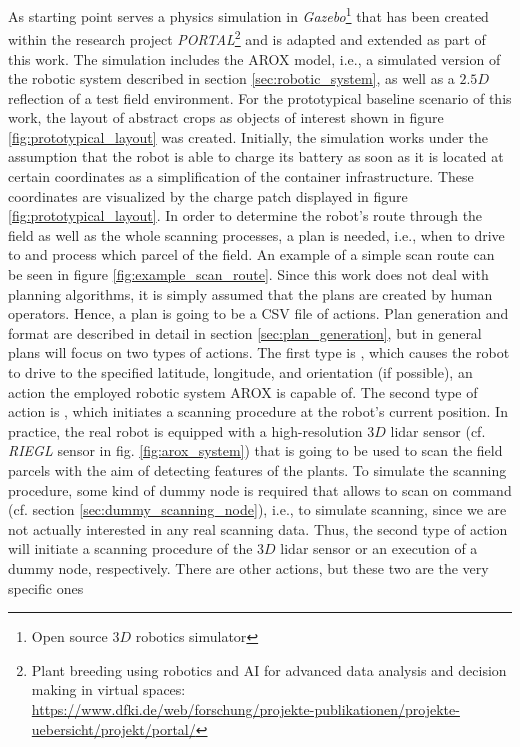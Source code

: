 \documentclass[english, master, utf8]{base/thesis_KBS}
\newcommand{\code}{\collectverb{\codebox}}
\begin{document}
As starting point serves a physics simulation in \textit{Gazebo}\footnote{Open source $3D$ robotics simulator} that has been created within the research project
\textit{PORTAL}\footnote{Plant breeding using robotics and AI for advanced data analysis and decision making in virtual spaces:\\
\textcolor{link-color}{\url{https://www.dfki.de/web/forschung/projekte-publikationen/projekte-uebersicht/projekt/portal/}}}
and is adapted and extended as part of this work. The simulation includes the AROX model, i.e., a simulated version of the robotic system described in section \ref{sec:robotic_system},
as well as a $2.5D$ reflection of a test field environment. For the prototypical baseline scenario of this work, the layout of abstract crops as objects of interest shown in 
figure \ref{fig:prototypical_layout} was created. Initially, the simulation works under the assumption that the robot is able to charge its battery as soon as it is located at 
certain coordinates as a simplification of the container infrastructure. These coordinates are visualized by the charge patch displayed in figure \ref{fig:prototypical_layout}.
In order to determine the robot's route through the field as well as the whole scanning processes, a plan is needed, i.e., when to drive to and process which parcel of the field. 
An example of a simple scan route can be seen in figure \ref{fig:example_scan_route}. Since this work does not deal with planning algorithms, it is simply assumed that the plans
are created by human operators. Hence, a plan is going to be a CSV file of actions. Plan generation and format are described in detail in section \ref{sec:plan_generation}, 
but in general plans will focus on two types of actions. The first type is \code{drive_to(lat, lng, theta)}, which causes the robot to drive to the specified latitude, 
longitude, and orientation (if possible), an action the employed robotic system AROX is capable of. The second type of action is \code{scan}, which initiates a scanning procedure
at the robot's current position. In practice, the real robot is equipped with a high-resolution $3D$ lidar sensor (cf. \textit{RIEGL} sensor in fig. \ref{fig:arox_system}) that is going 
to be used to scan the field parcels with the aim of detecting features of the plants. To simulate the scanning procedure, some kind of dummy node is required that allows to 
scan on command (cf. section \ref{sec:dummy_scanning_node}), i.e., to simulate scanning, since we are not actually interested in any real scanning data. Thus, the second type 
of action will initiate a scanning procedure of the $3D$ lidar sensor or an execution of a dummy node, respectively. There are other actions, but these two are the very specific ones
\end{document}
